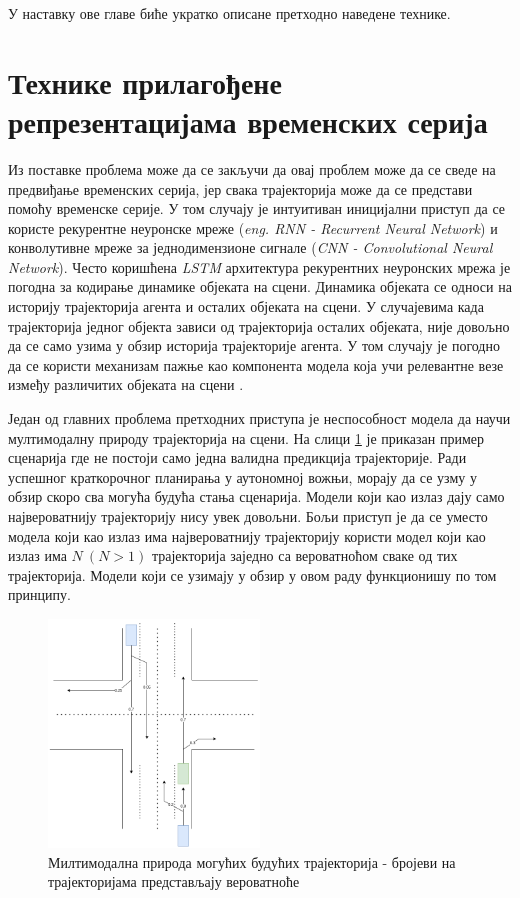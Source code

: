 \documentclass[11pt,oneside]{memoir}
\begin{document}
У наставку ове главе биће укратко описане претходно наведене технике.

\section{Технике прилагођене репрезентацијама временских серија}

Из поставке проблема може да се закључи да овај проблем може да се сведе на предвиђање временских серија, јер свака 
трајекторија може да се представи помоћу временске серије. У том случају је интуитиван иницијални приступ да се користе рекурентне неуронске мреже
(\textit{eng. RNN - Recurrent Neural Network}) и конволутивне мреже за једнодимензионе сигнале (\textit{CNN - Convolutional Neural Network}). 
Често коришћена \textit{LSTM} архитектура рекурентних неуронских мрежа је погодна за кодирање динамике објеката на сцени. 
Динамика објеката се односи на историју трајекторија агента и осталих објеката на сцени.
У случајевима када трајекторија једног објекта зависи од трајекторија осталих објеката, није довољно да се само узима у обзир
историја трајекторије агента. У том случају је погодно да се користи механизам пажње као компонента модела која учи 
релевантне везе између различитих објеката на сцени \cite{argoverse, social_lstm, attention_is_all_you_need}. 

Један од главних проблема претходних приступа је неспособност модела да научи мултимодалну природу трајекторија на сцени. На слици
\ref{multimodal-example} је приказан пример сценарија где не постоји само једна валидна предикција трајекторије.
Ради успешног краткорочног планирања у аутономној вожњи, морају да се узму у обзир скоро сва могућа будућа стања сценарија. Модели
који као излаз дају само највероватнију трајекторију нису увек довољни. Бољи приступ је да се уместо модела који као излаз има највероватнију трајекторију користи
модел који као излаз има $N\ (N > 1)$ трајекторија заједно са вероватноћом сваке од тих трајекторија. Модели који се узимају у обзир у овом раду функционишу
по том принципу.

\begin{figure}[H]
  \centering
  \includegraphics[width=0.5\textwidth]{images/multimodal.drawio.png}
  \caption{Милтимодална природа могућих будућих трајекторија - бројеви на трајекторијама представљају вероватноће}
  \label{multimodal-example}
\end{figure}
\end{document}
